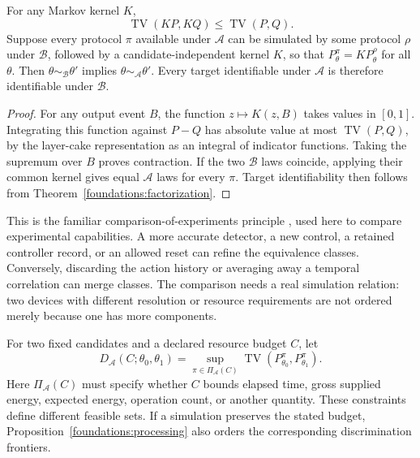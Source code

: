 \begin{proposition}
\label{foundations:processing}
For any Markov kernel $K$,
\begin{equation}
 \operatorname{TV}(KP,KQ)\leq\operatorname{TV}(P,Q).
\end{equation}
Suppose every protocol $\pi$ available under $\mathcal A$ can be simulated
by some protocol $\rho$ under $\mathcal B$, followed by a
candidate-independent kernel $K$, so that
$P_\theta^\pi=K P_\theta^\rho$ for all $\theta$. Then
$\theta\sim_{\mathcal B}\theta'$ implies
$\theta\sim_{\mathcal A}\theta'$. Every target identifiable under
$\mathcal A$ is therefore identifiable under $\mathcal B$.
\end{proposition}
\begin{proof}
For any output event $B$, the function $z\mapsto K(z,B)$ takes values in
$[0,1]$. Integrating this function against $P-Q$ has absolute value at most
$\operatorname{TV}(P,Q)$, by the layer-cake representation as an integral
of indicator functions. Taking the supremum over $B$ proves contraction.
If the two $\mathcal B$ laws coincide, applying their common kernel gives
equal $\mathcal A$ laws for every $\pi$. Target identifiability then follows
from Theorem~\ref{foundations:factorization}.
\end{proof}

This is the familiar comparison-of-experiments principle
\cite{f_blackwell}, used here to compare experimental capabilities. A more
accurate detector, a new control, a retained controller record, or an allowed
reset can refine the equivalence classes. Conversely, discarding the action
history or averaging away a temporal correlation can merge classes.
The comparison needs a real simulation relation: two devices with
different resolution or resource requirements are not ordered merely
because one has more components.

For two fixed candidates and a declared resource budget $C$, let
\begin{equation}\label{foundations:frontier}
 D_{\mathcal A}(C;\theta_0,\theta_1)
 =\sup_{\pi\in\Pi_{\mathcal A}(C)}
   \operatorname{TV}(P_{\theta_0}^\pi,P_{\theta_1}^\pi).
\end{equation}
Here $\Pi_{\mathcal A}(C)$ must specify whether $C$ bounds elapsed time,
gross supplied energy, expected energy, operation count, or another
quantity. These constraints define different feasible sets. If a simulation
preserves the stated budget, Proposition~\ref{foundations:processing}
also orders the corresponding discrimination frontiers.

